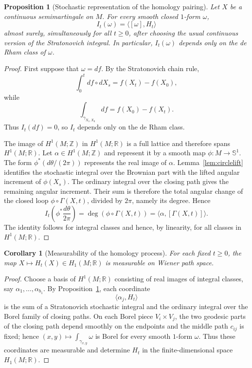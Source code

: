 \documentclass[a4paper,reqno]{amsart}
\newcommand{\R}{\mathbb R}
\newcommand{\Z}{\mathbb Z}
\newcommand{\Sph}{\mathbb S}
\newtheorem{proposition}[theorem]{Proposition}
\newtheorem{corollary}[theorem]{Corollary}
\theoremstyle{definition}
\begin{document}
\begin{proposition}[Stochastic representation of the homology pairing]\label{prop:pairing}
Let $X$ be a continuous semimartingale on $M$.  For every smooth closed
$1$-form $\omega$,
\begin{equation}\label{eq:pairingidentity}
   I_t(\omega)=\langle[\omega],H_t\rangle
\end{equation}
almost surely, simultaneously for all $t\ge0$, after choosing the usual
continuous version of the Stratonovich integral.  In particular,
$I_t(\omega)$ depends only on the de Rham class of $\omega$.
\end{proposition}

\begin{proof}
First suppose that $\omega=df$.  By the Stratonovich chain rule,
\[
   \int_0^t df\circ dX_s=f(X_t)-f(X_0),
\]
while
\[
   \int_{\gamma_{X_t,X_0}}df=f(X_0)-f(X_t).
\]
Thus $I_t(df)=0$, so $I_t$ depends only on the de Rham class.

The image of $H^1(M;\Z)$ in $H^1(M;\R)$ is a full lattice and therefore spans $H^1(M;\R)$.  Let $\alpha\in H^1(M;\Z)$ and represent it by a smooth map $\phi:M\to\Sph^1$.  The form $\phi^*(d\theta/(2\pi))$ represents the real image of $\alpha$.  Lemma~\ref{lem:circlelift} identifies the stochastic integral over the Brownian part with the lifted angular increment of $\phi(X_s)$.  The ordinary integral over the closing path gives the remaining angular increment.  Their sum is therefore the total angular change of the closed loop $\phi\circ\Gamma(X,t)$, divided by $2\pi$, namely its degree.  Hence
\[
 I_t\!\left(\phi^*\frac{d\theta}{2\pi}\right)
 =\deg(\phi\circ\Gamma(X,t))
 =\langle\alpha,[\Gamma(X,t)]\rangle.
\]
The identity follows for integral classes and hence, by linearity, for all classes in $H^1(M;\R)$.
\end{proof}

\begin{corollary}[Measurability of the homology process]\label{cor:measurableHt}
For each fixed $t\ge0$, the map $X\mapsto H_t(X)\in H_1(M;\R)$ is measurable on Wiener path space.
\end{corollary}

\begin{proof}
Choose a basis of $H^1(M;\R)$ consisting of real images of integral classes,
say $\alpha_1,\ldots,\alpha_{b_1}$.  By Proposition~\ref{prop:pairing}, each coordinate
\[
\langle\alpha_j,H_t\rangle
\]
is the sum of a Stratonovich stochastic integral and the ordinary integral over the Borel family of closing paths.  On each Borel piece $V_i\times V_j$, the two geodesic parts of the closing path depend smoothly on the endpoints and the middle path $c_{ij}$ is fixed; hence
$(x,y)\mapsto\int_{\gamma_{x,y}}\omega$ is Borel for every smooth $1$-form $\omega$.
Thus these coordinates are measurable and determine $H_t$ in the finite-dimensional space $H_1(M;\R)$.
\end{proof}
\end{document}
